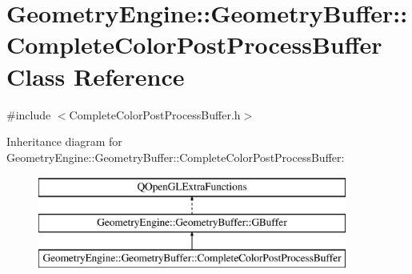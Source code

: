 \hypertarget{class_geometry_engine_1_1_geometry_buffer_1_1_complete_color_post_process_buffer}{}\section{Geometry\+Engine\+::Geometry\+Buffer\+::Complete\+Color\+Post\+Process\+Buffer Class Reference}
\label{class_geometry_engine_1_1_geometry_buffer_1_1_complete_color_post_process_buffer}


{\ttfamily \#include $<$Complete\+Color\+Post\+Process\+Buffer.\+h$>$}

Inheritance diagram for Geometry\+Engine\+::Geometry\+Buffer\+::Complete\+Color\+Post\+Process\+Buffer\+:\begin{figure}[H]
\begin{center}
\leavevmode
\includegraphics[height=3.000000cm]{class_geometry_engine_1_1_geometry_buffer_1_1_complete_color_post_process_buffer}
\end{center}
\end{figure}
